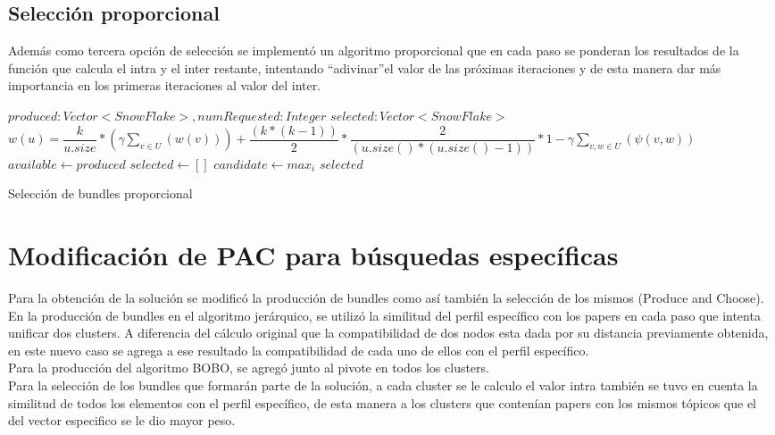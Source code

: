 \subsection{Selección proporcional}
Además como tercera opción de selección se implementó un algoritmo proporcional que en cada paso se 
ponderan los resultados de la función que calcula el intra y el inter restante, intentando 
\textquotedblleft adivinar\textquotedblright  el valor de las próximas iteraciones y de esta manera 
dar más importancia en los primeras iteraciones al valor del inter.
\begin{algorithm}[H]
\begin{algorithmic}[1]
\REQUIRE $produced:Vector<SnowFlake>, numRequested:Integer$
\ENSURE $selected:Vector<SnowFlake>$
\STATE $w(u) = \dfrac{k}{u.size} * (\gamma \sum_{v \in U}(w(v))) + \dfrac{(k * (k-1))}{2} * \dfrac{2}{(u.size() * (u.size() - 1))} * 1 - \gamma \sum_{v,w \in U}(\psi(v,w))$
\STATE $available \leftarrow produced$
\STATE $selected \leftarrow []$
\STATE $candidate \leftarrow max_{i}$
\ENDWHILE
\RETURN $selected$
\end{algorithmic}
\caption{Selección de bundles proporcional}\label{alg:algSelProp}
\end{algorithm}

\section{Modificación de PAC para búsquedas específicas}
Para la obtención de la solución se modificó la producción de bundles como así también la 
selección de los mismos (Produce and Choose). \\
En la producción de bundles en el algoritmo jerárquico, se utilizó la similitud del perfil 
específico con los papers en cada paso que intenta unificar dos clusters. A diferencia del cálculo 
original que la compatibilidad de dos nodos esta dada por su distancia previamente obtenida, en 
este nuevo caso se agrega a ese resultado la compatibilidad de cada uno de ellos con el perfil 
específico. \\
Para la producción del algoritmo BOBO, se agregó junto al pivote en todos los clusters. \\
Para la selección de los bundles que formarán parte de la solución, a cada cluster se le 
calculo el valor intra también se tuvo en cuenta la similitud de todos los elementos con el perfil  
específico, de esta manera a los clusters que contenían papers con los mismos tópicos que el del 
vector especifico se le dio mayor peso.


